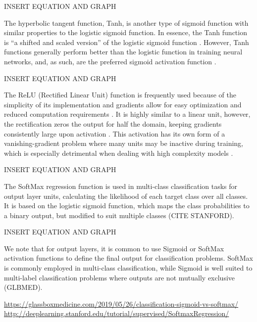 \documentclass{article}
\begin{document}
INSERT EQUATION AND GRAPH

The hyperbolic tangent function, Tanh, is another type of sigmoid function with similar properties to the logistic sigmoid function. In essence, the Tanh function is “a shifted and scaled version” of the logistic sigmoid function \cite{lederer2021activation}. However, Tanh functions generally perform better than the logistic function in training neural networks, and, as such, are the preferred sigmoid activation function \cite{Goodfellow-et-al-2016}.  

INSERT EQUATION AND GRAPH

The ReLU (Rectified Linear Unit) function is frequently used because of the simplicity of its implementation and gradients allow for easy optimization and reduced computation requirements \cite{lederer2021activation,Goodfellow-et-al-2016}. It is highly similar to a linear unit, however, the rectification zeros the output for half the domain, keeping gradients consistently large upon activation \cite{Goodfellow-et-al-2016}. This activation has its own form of a vanishing-gradient problem where many units may be inactive during training, which is especially detrimental when dealing with high complexity models \cite{lederer2021activation}. 

INSERT EQUATION AND GRAPH

The SoftMax regression function is used in multi-class classification tasks for output layer units, calculating the likelihood of each target class over all classes.  It is based on the logistic sigmoid function, which maps the class probabilities to a binary output, but modified to suit multiple classes (CITE STANFORD).

INSERT EQUATION AND GRAPH

We note that for output layers, it is common to use Sigmoid or SoftMax activation functions to define the final output for classification problems. SoftMax is commonly employed in multi-class classification, while Sigmoid is well suited to multi-label classification problems where outputs are not mutually exclusive (GLBMED).

\url{https://glassboxmedicine.com/2019/05/26/classification-sigmoid-vs-softmax/}
\url{http://deeplearning.stanford.edu/tutorial/supervised/SoftmaxRegression/}
\end{document}

